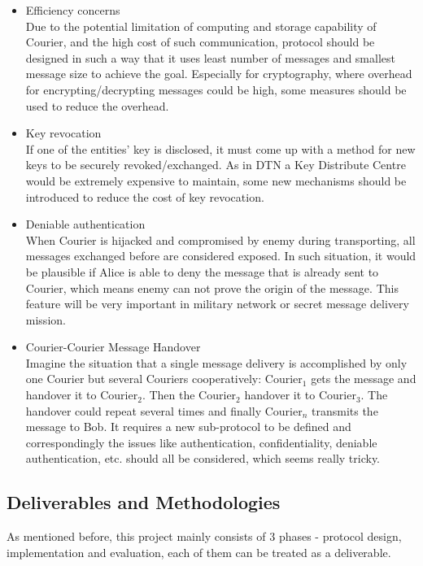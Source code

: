 \documentclass[11pt,a4paper]{article}
\begin{document}
\begin{itemize}
\item Efficiency concerns\\
Due to the potential limitation of computing and storage capability of Courier, and the high cost of such communication, protocol should be designed in such a way that it uses least number of messages and smallest message size to achieve the goal. Especially for cryptography, where overhead for encrypting/decrypting messages could be high, some measures should be used to reduce the overhead.
\item Key revocation\\
If one of the entities' key is disclosed, it must come up with a method for new keys to be securely revoked/exchanged. As in DTN a Key Distribute Centre would be extremely expensive to maintain, some new mechanisms should be introduced to reduce the cost of key revocation.
\item Deniable authentication\\
When Courier is hijacked and compromised by enemy during transporting, all messages exchanged before are considered exposed. In such situation, it would be plausible if Alice is able to deny the message that is already sent to Courier, which means enemy can not prove the origin of the message. This feature will be very important in military network or secret message delivery mission.
\item Courier-Courier Message Handover\\
Imagine the situation that a single message delivery is accomplished by only one Courier but several Couriers cooperatively: Courier$_1$ gets the message and handover it to Courier$_2$. Then the Courier$_2$ handover it to Courier$_3$. The handover could repeat several times and finally Courier$_n$ transmits the message to Bob. It requires a new sub-protocol to be defined and correspondingly the issues like authentication, confidentiality, deniable authentication, etc. should all be considered, which seems really tricky.
\end{itemize}

\subsection{Deliverables and Methodologies}
As mentioned before, this project mainly consists of 3 phases - protocol design, implementation and evaluation, each of them can be treated as a deliverable.
\end{document}
